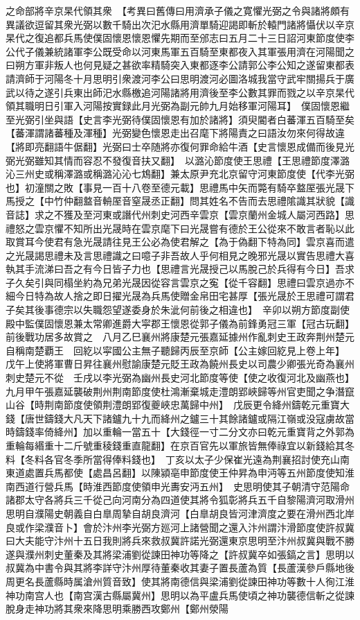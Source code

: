 之命部將辛京杲代領其衆　【考異曰舊傳曰用濟承子儀之寛懼光弼之令與諸將頗有異議欲逗留其衆光弼以數千騎出次汜水縣用濟單騎迎謁即斬於轅門諸將懾伏以辛京杲代之復追都兵馬使僕固懷恩懷恩懼先期而至邠志曰五月二十三日詔河東節度使李公代子儀兼統諸軍李公既受命以河東馬軍五百騎至東都夜入其軍張用濟在河陽聞之曰朔方軍非叛人也何見疑之甚欲率精騎突入東都逐李公請郭公李公知之遂留東都表請濟師于河陽冬十月思明引衆渡河李公曰思明渡河必圖洛城我當守武牢關揚兵于廣武以待之遂引兵東出師汜水縣檄追河陽諸將用濟後至李公數其罪而戮之以辛京杲代領其職明日引軍入河陽按實録此月光弼為副元帥九月始移軍河陽耳】　僕固懷恩繼至光弼引坐與語【史言李光弼待僕固懷恩有加於諸將】須臾閽者白蕃渾五百騎至矣【蕃渾謂諸蕃種及渾種】光弼變色懷恩走出召麾下將陽責之曰語汝勿來何得故違【將即亮翻語牛倨翻】光弼曰士卒随將亦復何罪命給牛酒【史言懷恩成備而後見光弼光弼雖知其情而容忍不發復音扶又翻】　以潞沁節度使王思禮【王思禮節度澤潞沁三州史或稱澤潞或稱潞沁沁七鴆翻】兼太原尹充北京留守河東節度使【代李光弼也】初潼關之敗【事見一百十八卷至德元載】思禮馬中矢而斃有騎卒盩厔張光晟下馬授之【中竹仲翻盩音輈厔音窒晟丞正翻】問其姓名不告而去思禮隂識其狀貌【識音誌】求之不獲及至河東或譖代州刺史河西辛雲京【雲京蘭州金城人屬河西路】思禮怒之雲京懼不知所出光晟時在雲京麾下曰光晟嘗有德於王公從來不敢言者恥以此取賞耳今使君有急光晟請往見王公必為使君解之【為于偽翻下特為同】雲京喜而遣之光晟謁思禮未及言思禮識之曰噫子非吾故人乎何相見之晚邪光晟以實告思禮大喜執其手流涕曰吾之有今日皆子力也【思禮言光晟授己以馬脫己於兵得有今日】吾求子久矣引與同榻坐約為兄弟光晟因從容言雲京之寃【從千容翻】思禮曰雲京過亦不細今日特為故人捨之即日擢光晟為兵馬使贈金帛田宅甚厚【張光晟於王思禮可謂君子矣其後事德宗以失職怨望遂委身於朱泚何前後之相違也】　辛卯以朔方節度副使殿中監僕固懷恩兼太常卿進爵大寜郡王懷恩從郭子儀為前鋒勇冠三軍【冠古玩翻】前後戰功居多故賞之　八月乙巳襄州將康楚元張嘉延據州作亂刺史王政奔荆州楚元自稱南楚覇王　回紇以寜國公主無子聽歸丙辰至京師【公主嫁回紇見上卷上年】　戊午上使將軍曹日昇往襄州慰諭康楚元貶王政為饒州長史以司農少卿張光奇為襄州刺史楚元不從　壬戌以李光弼為幽州長史河北節度等使【使之收復河北及幽燕也】九月甲午張嘉延襲破荆州荆南節度使杜鴻漸棄城走澧朗郢峽歸等州官吏聞之争潛竄山谷【時荆南節度使領荆澧朗郢復夔峽忠萬歸中州】　戊辰更令絳州鑄乾元重寶大錢【唐世鑄錢大凡天下諸鑪九十九而絳州之鑪三十其餘諸鑪或隔江嶺或没寇虜故當時鑄錢率倚絳州】加以重輪一當五十【大錢徑一寸二分文亦曰乾元重寶背之外郭為重輪每緡重十二斤號重稜錢重直龍翻】在京百官先以軍旅皆無俸祿宜以新錢給其冬料【冬料各官冬季所當得俸料錢也】　丁亥以太子少保崔光遠為荆襄招討使充山南東道處置兵馬都使【處昌呂翻】以陳潁亳申節度使王仲昇為申沔等五州節度使知淮南西道行營兵馬【時淮西節度使領申光夀安沔五州】　史思明使其子朝清守范陽命諸郡太守各將兵三千從己向河南分為四道使其將令狐彰將兵五千自黎陽濟河取滑州思明自濮陽史朝義自白臯周摯自胡良濟河【白臯胡良皆河津濟度之要在滑州西北岸良或作梁濮音卜】會於汴州李光弼方廵河上諸營聞之還入汴州謂汴滑節度使許叔冀曰大夫能守汴州十五日我則將兵來救叔冀許諾光弼還東京思明至汴州叔冀與戰不勝遂與濮州刺史董秦及其將梁浦劉從諫田神功等降之【許叔冀卒如張鎬之言】思明以叔冀為中書令與其將李詳守汴州厚待董秦收其妻子置長蘆為質【長蘆漢參戶縣地後周更名長蘆縣時属滄州質音致】使其將南德信與梁浦劉從諫田神功等數十人徇江淮神功南宫人也【南宫漢古縣屬冀州】思明以為平盧兵馬使頃之神功襲德信斬之從諫脫身走神功將其衆來降思明乘勝西攻鄭州【鄭州滎陽